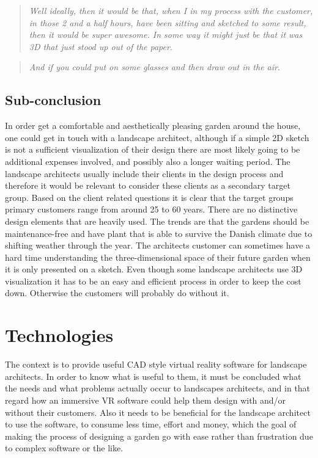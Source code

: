 		\begin{quote}
			\textit{Well ideally, then it would be that, when I in my process with the customer, in those 2 and a half hours, have been sitting and sketched to some result, then it would be super awesome. In some way it might just be that it was 3D that just stood up out of the paper}\label{quote:expertIdeas3}.\\
		\end{quote}
		
		\begin{quote}
			\textit{And if you could put on some glasses and then draw out in the air}\label{quote:expertIdeas4}.\\
		\end{quote}
		
	\subsection{Sub-conclusion}
		In order get a comfortable and aesthetically pleasing garden around the house, one could get in touch with a landscape architect, although if a simple 2D sketch is not a sufficient visualization of their design there are most likely going to be additional expenses involved, and possibly also a longer waiting period.
		The landscape architects usually include their clients in the design process and therefore it would be relevant to consider these clients as a secondary target group. Based on the client related questions it is clear that the target groups primary customers range from around 25 to 60 years. There are no distinctive design elements that are heavily used. The trends are that the gardens should be maintenance-free and have plant that is able to survive the Danish climate due to shifting weather through the year. The architects customer can sometimes have a hard time understanding the three-dimensional space of their future garden when it is only presented on a sketch. Even though some landscape architects use 3D visualization it has to be an easy and efficient process in order to keep the cost down. Otherwise the customers will probably do without it.
		
	\section{Technologies}\label{sec:technologies}
		The context is to provide useful CAD style virtual reality software for landscape architects. In order to know what is useful to them, it must be concluded what the needs and what problems actually occur to landscapes architects, and in that regard how an immersive VR software could help them design with and/or without their customers. Also it needs to be beneficial for the landscape architect to use the software, to consume less time, effort and money, which the goal of making the process of designing a garden go with ease rather than frustration due to complex software or the like.\\
	
